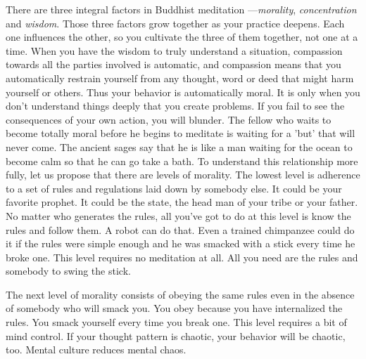 There are three integral factors in Buddhist meditation ---\emph{morality},
\emph{concentration} and \emph{wisdom}. Those three factors grow together as your practice
deepens. Each one influences the other, so you cultivate the three of them
together, not one at a time. When you have the wisdom to truly understand a
situation, compassion towards all the parties involved is automatic, and
compassion means that you automatically restrain yourself from any thought, word
or deed that might harm yourself or others. Thus your behavior is automatically
moral. It is only when you don't understand things deeply that you create
problems. If you fail to see the consequences of your own action, you will
blunder. The fellow who waits to become totally moral before he begins to
meditate is waiting for a 'but' that will never come. The ancient sages say that
he is like a man waiting for the ocean to become calm so that he can go take a
bath. To understand this relationship more fully, let us propose that there are
levels of morality. The lowest level is adherence to a set of rules and
regulations laid down by somebody else. It could be your favorite prophet. It
could be the state, the head man of your tribe or your father. No matter who
generates the rules, all you've got to do at this level is know the rules and
follow them. A robot can do that. Even a trained chimpanzee could do it if the
rules were simple enough and he was smacked with a stick every time he broke
one. This level requires no meditation at all. All you need are the rules and
somebody to swing the stick.

The next level of morality consists of obeying the same rules even in the
absence of somebody who will smack you. You obey because you have internalized
the rules. You smack yourself every time you break one. This level requires a
bit of mind control. If your thought pattern is chaotic, your behavior will be
chaotic, too. Mental culture reduces mental chaos.

